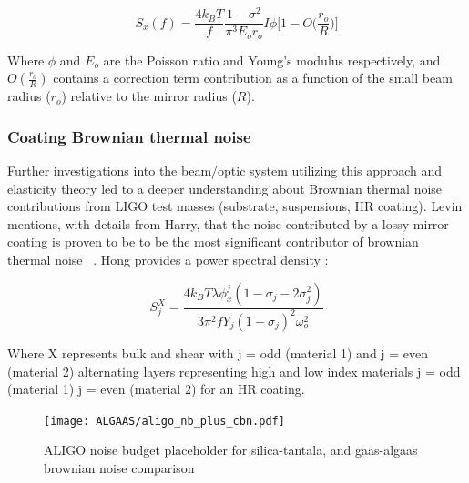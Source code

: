 \begin{equation}
S_x(f) = \frac{4 k_B T}{f} \frac{1-\sigma^2}{\pi^3 E_o r_o} I\phi \bigg[1- O\bigg( \frac{r_o}{R} \bigg)\bigg]
\end{equation}


Where $\phi$ and $E_o$ are the Poisson ratio and Young's modulus respectively, and $O(\frac{r_o}{R})$ contains a correction term contribution as a function of the small beam radius ($r_o$) relative to the mirror radius ($R$).

\subsubsection{Coating Brownian thermal noise}
Further investigations into the beam/optic system utilizing this approach and elasticity theory led to a deeper understanding about Brownian thermal noise contributions from LIGO test masses (substrate, suspensions, HR coating). Levin mentions, with details from Harry, that the noise contributed by a lossy mirror coating is proven to be to be the most significant contributor of brownian thermal noise ~\cite{harry:2006}. Hong provides a power spectral density \cite{hong:2013}:

\begin{equation}
S_j^X = \frac{4k_B T \lambda \phi_x^j(1- \sigma_j - 2 \sigma_j^2)}{3 \pi^2 f Y_j (1-\sigma_j)^2 \omega_o^2}
\end{equation}

Where X represents bulk and shear with j = odd (material 1) and j = even (material 2) alternating layers representing high and low index materials j = odd (material 1) j = even (material 2) for an HR coating.

\begin{figure}[H]
    \begin{center}
    \texttt{[image: ALGAAS/aligo\_nb\_plus\_cbn.pdf]}
    \end{center}
    \caption{ALIGO noise budget placeholder for silica-tantala, and gaas-algaas brownian noise comparison}
\label{fig:aligotncomp}
\end{figure}

